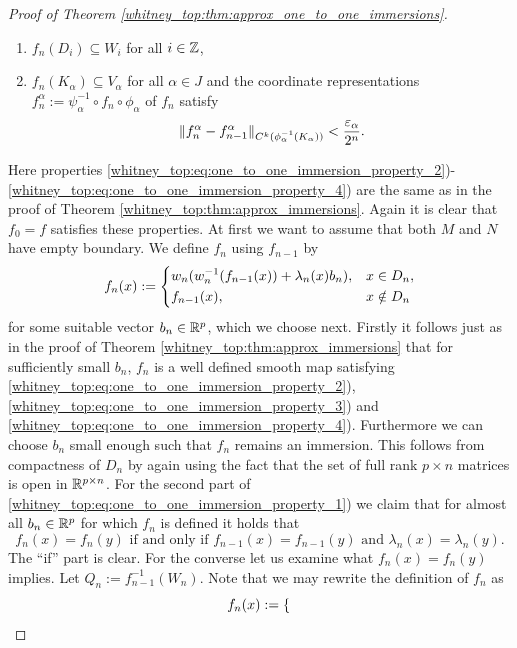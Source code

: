 \begin{proof}[Proof of Theorem \ref{whitney_top:thm:approx_one_to_one_immersions}]
\begin{enumerate}[1)]
        \item \label{whitney_top:eq:one_to_one_immersion_property_3} $f_n(D_i) \subseteq W_i$ for all $i \in \mathbb{Z}$,
        \item \label{whitney_top:eq:one_to_one_immersion_property_4} $f_n(K_\alpha) \subseteq V_\alpha$ for all $\alpha \in J$ and the coordinate representations $f_n^\alpha := \psi^{-1}_\alpha \circ f_n \circ \phi_\alpha$ of $f_n$ satisfy 
        \[
        \lVert f_n^\alpha - f_{n-1}^\alpha\rVert_{C^k(\phi_\alpha^{-1}(K_\alpha))} < \frac{\varepsilon_\alpha}{2^n}.
        \]
    \end{enumerate}
    Here properties \ref{whitney_top:eq:one_to_one_immersion_property_2})- \ref{whitney_top:eq:one_to_one_immersion_property_4}) are the same as in the proof of Theorem \ref{whitney_top:thm:approx_immersions}. Again it is clear that $f_0 = f$ satisfies these properties. At first we want to assume that both $M$ and $N$ have empty boundary. We define $f_n$ using $f_{n-1}$ by
    \[
    f_n(x) := \begin{dcases}
        w_n(w_n^{-1}(f_{n-1}(x)) + \lambda_n(x)b_n), & x \in D_n, \\
        f_{n-1}(x), & x \notin D_n
    \end{dcases}
    \]
    for some suitable vector $b_n \in \mathbb{R}^p$, which we choose next. Firstly it follows just as in the proof of Theorem \ref{whitney_top:thm:approx_immersions} that for sufficiently small $b_n$, $f_n$ is a well defined smooth map satisfying \ref{whitney_top:eq:one_to_one_immersion_property_2}), \ref{whitney_top:eq:one_to_one_immersion_property_3}) and \ref{whitney_top:eq:one_to_one_immersion_property_4}). Furthermore we can choose $b_n$ small enough such that $f_n$ remains an immersion. This follows from compactness of $D_n$ by again using the fact that the set of full rank $p \times n$ matrices is open in $\mathbb{R}^{p \times n}$. For the second part of \ref{whitney_top:eq:one_to_one_immersion_property_1}) we claim that for almost all $b_n \in \mathbb{R}^p$ for which $f_n$ is defined it holds that 
    \begin{equation}
        f_n(x) = f_n(y) \text{ if and only if } f_{n-1}(x) = f_{n-1}(y) \text{ and } \lambda_n(x) = \lambda_n(y).
        \tag{$\star$}
        \label{whitney_top:eq:claim_one_to_one_immersions}
    \end{equation}
    The ``if'' part is clear. For the converse let us examine what $f_n(x) = f_n(y)$ implies. Let $Q_n := f_{n-1}^{-1}(W_n)$. Note that we may rewrite the definition of $f_n$ as 
    \[
    f_n(x) := \begin{dcases}

\end{dcases}\]
\end{proof}
